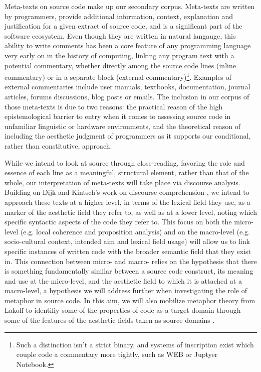 Meta-texts on source code make up our secondary corpus. Meta-texts are written by programmers, provide additional information, context, explanation and justification for a given extract of source code, and is a significant part of the software ecosystem. Even though they are written in natural langauge, this ability to write comments has been a core feature of any programming language very early on in the history of computing, linking any program text with a potential commentary, whether directly among the source code lines (inline commentary) or in a separate block (external commentary)\footnote{Such a distinction isn't a strict binary, and systems of inscription exist which couple code a commentary more tightly, such as WEB or Juptyer Notebook.}. Examples of external commentaries include user manuals, textbooks, documentation, journal articles, forums discussions, blog posts or emails. The inclusion in our corpus of those meta-texts is due to two reasons: the practical reason of the high epistemological barrier to entry when it comes to assessing source code in unfamiliar linguistic or hardware environments, and the theoretical reason of including the aesthetic judgment of programmers as it supports our conditional, rather than constitutive, approach.

While we intend to look at source through close-reading, favoring the role and essence of each line as a meaningful, structural element, rather than that of the whole, our interpretation of meta-texts will take place via discourse analysis. Building on Dijk and Kintsch's work on discourse comprehension \citep{dijk_strategies_1983}, we intend to approach these texts at a higher level, in terms of the lexical field they use, as a marker of the aesthetic field they refer to, as well as at a lower level, noting which specific syntactic aspects of the code they refer to. This focus on both the micro-level (e.g. local coherence and proposition analysis) and on the macro-level (e.g. socio-cultural context, intended aim and  lexical field usage) will allow us to link specific instances of written code with the broader semantic field that they exist in. This connection between micro- and macro- relies on the hypothesis that there is something fundamentally similar between a source code construct, its meaning and use at the micro-level, and the aesthetic field to which it is attached at a macro-level, a hypothesis we will address further when investigating the role of metaphor in source code. In this aim, we will also mobilize metaphor theory from Lakoff to identifiy some of the properties of code as a target domain through some of the features of the aesthetic fields taken as source domains \citep{lakoff_metaphors_1980}.


